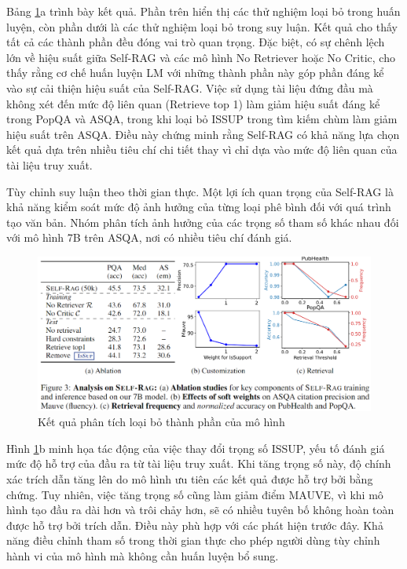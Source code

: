 \documentclass{article}
\begin{document}
Bảng \ref{fig:ablation_studies}a trình bày kết quả. Phần trên hiển thị các thử nghiệm loại bỏ trong huấn luyện, còn phần dưới là các thử nghiệm loại bỏ trong suy luận. Kết quả cho thấy tất cả các thành phần đều đóng vai trò quan trọng. Đặc biệt, có sự chênh lệch lớn về hiệu suất giữa Self-RAG và các mô hình No Retriever hoặc No Critic, cho thấy rằng cơ chế huấn luyện LM với những thành phần này góp phần đáng kể vào sự cải thiện hiệu suất của Self-RAG. Việc sử dụng tài liệu đứng đầu mà không xét đến mức độ liên quan (Retrieve top 1) làm giảm hiệu suất đáng kể trong PopQA và ASQA, trong khi loại bỏ ISSUP trong tìm kiếm chùm làm giảm hiệu suất trên ASQA. Điều này chứng minh rằng Self-RAG có khả năng lựa chọn kết quả dựa trên nhiều tiêu chí chi tiết thay vì chỉ dựa vào mức độ liên quan của tài liệu truy xuất.

Tùy chỉnh suy luận theo thời gian thực. Một lợi ích quan trọng của Self-RAG là khả năng kiểm soát mức độ ảnh hưởng của từng loại phê bình đối với quá trình tạo văn bản. Nhóm phân tích ảnh hưởng của các trọng số tham số khác nhau đối với mô hình 7B trên ASQA, nơi có nhiều tiêu chí đánh giá.

\begin{figure} 
    \centering
    \includegraphics[scale = 0.7]{ablation_studies.png}
    \caption{Kết quả phân tích loại bỏ thành phần của mô hình}
    \label{fig:ablation_studies}
\end{figure}

Hình \ref{fig:ablation_studies}b minh họa tác động của việc thay đổi trọng số ISSUP, yếu tố đánh giá mức độ hỗ trợ của đầu ra từ tài liệu truy xuất. Khi tăng trọng số này, độ chính xác trích dẫn tăng lên do mô hình ưu tiên các kết quả được hỗ trợ bởi bằng chứng. Tuy nhiên, việc tăng trọng số cũng làm giảm điểm MAUVE, vì khi mô hình tạo đầu ra dài hơn và trôi chảy hơn, sẽ có nhiều tuyên bố không hoàn toàn được hỗ trợ bởi trích dẫn. Điều này phù hợp với các phát hiện trước đây. Khả năng điều chỉnh tham số trong thời gian thực cho phép người dùng tùy chỉnh hành vi của mô hình mà không cần huấn luyện bổ sung.
\end{document}

